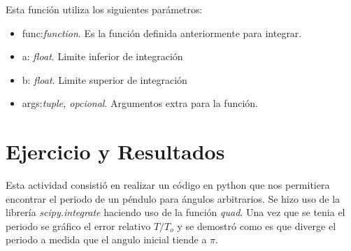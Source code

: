 \documentclass[12pt]{article}
\begin{document}
Esta función utiliza los siguientes parámetros:
\begin{itemize}
	\item func:\textit{function}. Es la función definida anteriormente para integrar.
	\item a: \textit{float}. Limite inferior de integración
	\item b: \textit{float}. Limite superior de integración
	\item args:\textit{tuple, opcional}. Argumentos extra para la función.
\end{itemize}
\section{Ejercicio y Resultados}
Esta actividad consistió en realizar un código en python que nos permitiera encontrar el periodo de un péndulo para ángulos arbitrarios. Se hizo uso de la librería \emph{scipy.integrate} haciendo uso de la función \textit{quad}. Una vez que se tenia el periodo se gráfico el error relativo $T/T_o$ y se demostró como es que diverge el periodo a medida que el angulo inicial tiende a $\pi$.\\
\end{document}
